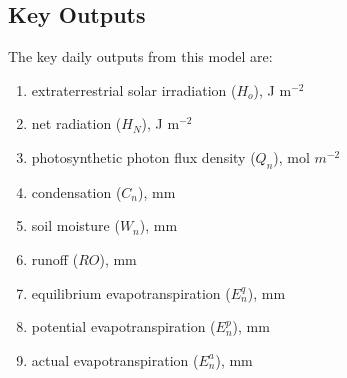 \subsection{Key Outputs}
\label{sec:outputs}
The key daily outputs from this model are:
\begin{enumerate}
	\item extraterrestrial solar irradiation ($H_o$), J m$^{-2}$
	\item net radiation ($H_N$), J m$^{-2}$
	\item photosynthetic photon flux density ($Q_n$), mol $m^{-2}$
	\item condensation ($C_n$), mm
	\item soil moisture ($W_n$), mm
	\item runoff ($RO$), mm
	\item equilibrium evapotranspiration ($E_n^q$), mm
	\item potential evapotranspiration ($E_n^p$), mm
	\item actual evapotranspiration ($E_n^a$), mm
\end{enumerate}

